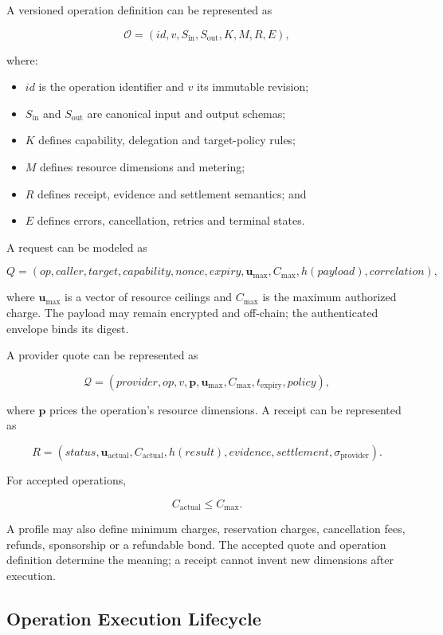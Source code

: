 \documentclass[11pt,oneside]{article}
\begin{document}
A versioned operation definition can be represented as

\[
  \mathcal{O} =
  (id, v, S_{\mathrm{in}}, S_{\mathrm{out}}, K, M, R, E),
\]

where:

\begin{itemize}
  \item $id$ is the operation identifier and $v$ its immutable revision;
  \item $S_{\mathrm{in}}$ and $S_{\mathrm{out}}$ are canonical input and output schemas;
  \item $K$ defines capability, delegation and target-policy rules;
  \item $M$ defines resource dimensions and metering;
  \item $R$ defines receipt, evidence and settlement semantics; and
  \item $E$ defines errors, cancellation, retries and terminal states.
\end{itemize}

A request can be modeled as

\[
  Q =
  (op, caller, target, capability, nonce, expiry,
   \mathbf{u}_{\max}, C_{\max}, h(payload), correlation),
\]

where $\mathbf{u}_{\max}$ is a vector of resource ceilings and $C_{\max}$ is the maximum
authorized charge. The payload may remain encrypted and off-chain; the authenticated
envelope binds its digest.

A provider quote can be represented as

\[
  \mathcal{Q} =
  (provider, op, v, \mathbf{p}, \mathbf{u}_{\max},
   C_{\max}, t_{\mathrm{expiry}}, policy),
\]

where $\mathbf{p}$ prices the operation's resource dimensions. A receipt can be represented as

\[
  R =
  (status, \mathbf{u}_{\mathrm{actual}}, C_{\mathrm{actual}},
   h(result), evidence, settlement, \sigma_{\mathrm{provider}}).
\]

For accepted operations,

\[
  C_{\mathrm{actual}} \leq C_{\max}.
\]

A profile may also define minimum charges, reservation charges, cancellation fees, refunds,
sponsorship or a refundable bond. The accepted quote and operation definition determine the
meaning; a receipt cannot invent new dimensions after execution.

\subsection{Operation Execution Lifecycle}
\end{document}
